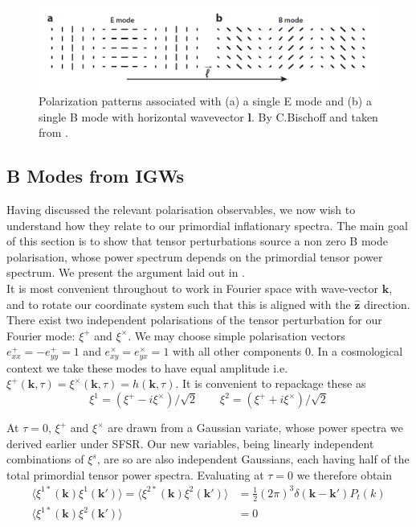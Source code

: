 \documentclass[a4paper,10pt]{article}
\renewcommand{\v}[1]{\mathbf{#1}}
\newcommand{\half}{\frac{1}{2}}
\newcommand{\unit}[1]{\hat{\v{#1}}}
\begin{document}
\begin{figure}[h]
  \includegraphics[width=0.7\linewidth]{EBintuition.png}
  \centering
  \caption{Polarization patterns associated with (a) a single E mode and (b) a single B mode with horizontal wavevector $\v{l}$. By C.Bischoff and taken from \cite{QBM}.}
  \label{EBint}
\end{figure}

\subsection{B Modes from IGWs}

Having discussed the relevant polarisation observables, we now wish to understand how they relate to our primordial inflationary spectra. The main goal of this section is to show that tensor perturbations source a non zero B mode polarisation, whose power spectrum depends on the primordial tensor power spectrum. We present the argument laid out in \cite{all-sky}.\\

It is most convenient throughout to work in Fourier space with wave-vector $\v{k}$, and to rotate our coordinate system such that this is aligned with the $\unit{z}$ direction. There exist two independent polarisations of the tensor perturbation for our Fourier mode: $\xi^+$ and $\xi^\times$. We may choose simple polarisation vectors $e^+_{xx}=-e^+_{yy}=1$ and $e^\times_{xy}=e^\times_{yx}=1$ with all other components 0. In a cosmological context we take these modes to have equal amplitude i.e. $\xi^+(\v{k},\tau)=\xi^\times(\v{k},\tau)=h(\v{k},\tau)$. It is convenient to repackage these as
\begin{equation}
\xi^1 = (\xi^+ - i\xi^\times)/\sqrt{2} \qquad \xi^2 = (\xi^+ + i\xi^\times)/\sqrt{2}
\end{equation}

At $\tau=0$, $\xi^+$ and $\xi^\times$ are drawn from a Gaussian variate, whose power spectra we derived earlier under SFSR. Our new variables, being linearly independent combinations of $\xi^s$, are so are also independent Gaussians, each having half of the total primordial tensor power spectra. Evaluating at $\tau=0$ we therefore obtain
\begin{equation}
\begin{split}
\langle \xi^{1*}(\v{k})\xi^{1}(\v{k'})\rangle=\langle \xi^{2*}(\v{k})\xi^{2}(\v{k'})\rangle &=\half (2\pi)^3\delta(\v{k}-\v{k'})P_t(k)\\
\langle \xi^{1*}(\v{k})\xi^{2}(\v{k'})\rangle &=0
\end{split}
\label{statprops}
\end{equation}
\end{document}
